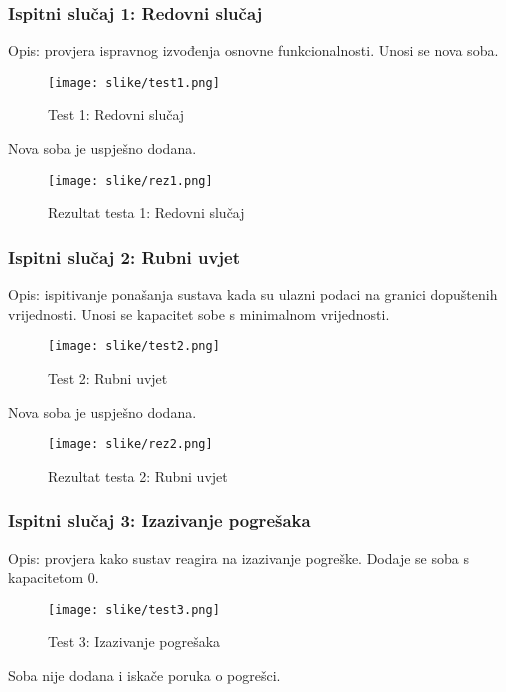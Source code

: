 \subsubsection{Ispitni slučaj 1: Redovni slučaj}
Opis: provjera ispravnog izvođenja osnovne funkcionalnosti. Unosi se nova soba.

\begin{figure}[H]
	\texttt{[image: slike/test1.png]}
	\centering
	\caption{Test 1: Redovni slučaj}
	\label{fig:test1}
\end{figure}

Nova soba je uspješno dodana.

\begin{figure}[H]
	\texttt{[image: slike/rez1.png]}
	\centering
	\caption{Rezultat testa 1: Redovni slučaj}
	\label{fig:rez1}
\end{figure}

\subsubsection{Ispitni slučaj 2: Rubni uvjet}
Opis: ispitivanje ponašanja sustava kada su ulazni podaci na granici dopuštenih vrijednosti. Unosi se kapacitet sobe s minimalnom vrijednosti.

\begin{figure}[H]
	\texttt{[image: slike/test2.png]}
	\centering
	\caption{Test 2: Rubni uvjet}
	\label{fig:test2}
\end{figure}

Nova soba je uspješno dodana.

\begin{figure}[H]
	\texttt{[image: slike/rez2.png]}
	\centering
	\caption{Rezultat testa 2: Rubni uvjet}
	\label{fig:rez2}
\end{figure}

\eject

\subsubsection{Ispitni slučaj 3: Izazivanje pogrešaka}
Opis: provjera kako sustav reagira na izazivanje pogreške. Dodaje se soba s kapacitetom 0.

\begin{figure}[H]
	\texttt{[image: slike/test3.png]}
	\centering
	\caption{Test 3: Izazivanje pogrešaka}
	\label{fig:test3}
\end{figure}

Soba nije dodana i iskače poruka o pogrešci. 

